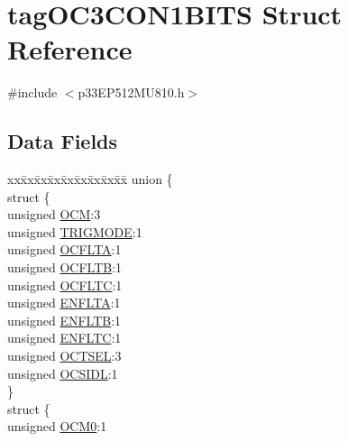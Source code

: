 \hypertarget{structtag_o_c3_c_o_n1_b_i_t_s}{}\section{tag\+O\+C3\+C\+O\+N1\+B\+I\+TS Struct Reference}
\label{structtag_o_c3_c_o_n1_b_i_t_s}


{\ttfamily \#include $<$p33\+E\+P512\+M\+U810.\+h$>$}

\subsection*{Data Fields}
\begin{DoxyCompactItemize}
\item 
\begin{tabbing}
xx\=xx\=xx\=xx\=xx\=xx\=xx\=xx\=xx\=\kill
union \{\\
\>struct \{\\
\>\>unsigned \hyperlink{structtag_o_c3_c_o_n1_b_i_t_s_a778fa0cf51a9477ac4e82d71a8733801}{OCM}:3\\
\>\>unsigned \hyperlink{structtag_o_c3_c_o_n1_b_i_t_s_a7a0057e0dca6e2663584b5b9e1da04c3}{TRIGMODE}:1\\
\>\>unsigned \hyperlink{structtag_o_c3_c_o_n1_b_i_t_s_acc967e41cecdeedc6ad4422f9ef1a6a3}{OCFLTA}:1\\
\>\>unsigned \hyperlink{structtag_o_c3_c_o_n1_b_i_t_s_a1fb30bb4421ef7c4bd0c66c379875593}{OCFLTB}:1\\
\>\>unsigned \hyperlink{structtag_o_c3_c_o_n1_b_i_t_s_a69a1772a4144abd579d17d28445b9934}{OCFLTC}:1\\
\>\>unsigned \hyperlink{structtag_o_c3_c_o_n1_b_i_t_s_a1e0f05fb23d516e003e4713fe8c1498a}{ENFLTA}:1\\
\>\>unsigned \hyperlink{structtag_o_c3_c_o_n1_b_i_t_s_a9d7aa97d5328b8b81ab7fd9145dfa0fc}{ENFLTB}:1\\
\>\>unsigned \hyperlink{structtag_o_c3_c_o_n1_b_i_t_s_a0b6f25c0f83f33b5501b6a2e6141a6ef}{ENFLTC}:1\\
\>\>unsigned \hyperlink{structtag_o_c3_c_o_n1_b_i_t_s_ae37d2a41dae2d2af1d82f7caae33cadb}{OCTSEL}:3\\
\>\>unsigned \hyperlink{structtag_o_c3_c_o_n1_b_i_t_s_afd05f4f249db4ef69b684e2f3fa6b703}{OCSIDL}:1\\
\>\} \\
\>struct \{\\
\>\>unsigned \hyperlink{structtag_o_c3_c_o_n1_b_i_t_s_a9271e84c9759ff10a7bc1cee3276e8f6}{OCM0}:1\\

\end{tabbing}
\end{DoxyCompactItemize}

